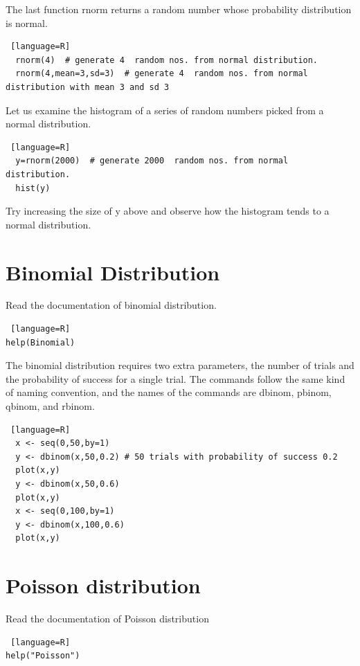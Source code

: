 \documentclass["../Applied_probabillity _and_statistics_lab_KTU.tex"]{subfiles}
\begin{document}
The last function rnorm returns a  random number whose probability distribution is normal.
\begin{lstlisting} [language=R]
  rnorm(4)  # generate 4  random nos. from normal distribution.
  rnorm(4,mean=3,sd=3)  # generate 4  random nos. from normal distribution with mean 3 and sd 3
\end{lstlisting}
Let us examine the histogram of a series of random numbers picked from a normal distribution.


\begin{lstlisting} [language=R]
  y=rnorm(2000)  # generate 2000  random nos. from normal distribution.
  hist(y)
\end{lstlisting}

Try increasing the  size of y above and observe how the histogram tends to a normal distribution.

\section{Binomial Distribution}

Read the documentation of binomial distribution.

\begin{lstlisting} [language=R]
help(Binomial)
\end{lstlisting}

The binomial distribution requires two extra parameters, the number of trials and the probability of success for a single trial. The commands follow the same kind of naming convention, and the names of the commands are dbinom, pbinom, qbinom, and rbinom.
\begin{lstlisting} [language=R]
  x <- seq(0,50,by=1)
  y <- dbinom(x,50,0.2) # 50 trials with probability of success 0.2
  plot(x,y)
  y <- dbinom(x,50,0.6)
  plot(x,y)
  x <- seq(0,100,by=1)
  y <- dbinom(x,100,0.6)
  plot(x,y)
\end{lstlisting}

\section{Poisson distribution}
Read the documentation of Poisson distribution

\begin{lstlisting} [language=R]
help("Poisson")
\end{lstlisting}
\end{document}
